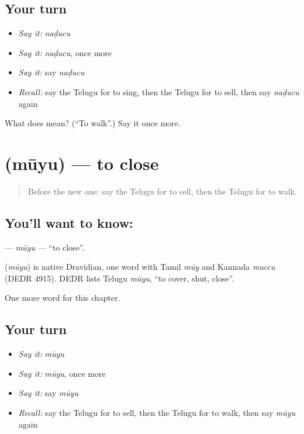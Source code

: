 \subsection*{Your turn}
\begin{itemize}
\raggedright
  \item \emph{Say it:} \emph{naḍucu}
  \item \emph{Say it:} \emph{naḍucu}, once more
  \item \emph{Say it:} say \emph{naḍucu}
  \item \emph{Recall:} say the Telugu for to sing, then the Telugu for to sell, then say \emph{naḍucu} again
\end{itemize}

\begin{tcolorbox}[breakable,colback=teal!4,colframe=teal!35!black,title={Before you move on}]
What does  mean? (\textquotedblleft{}To walk\textquotedblright{}.) Say it once more.
\end{tcolorbox}
\section[\texorpdfstring{\te{మూయు} (mūyu)}{మూయు (mūyu)}]{ (mūyu) — to close}

\label{lesson:TE-C149-muyu}



\begin{quote}
Before the new one: say the Telugu for to sell, then the Telugu for to walk.
\end{quote}

\subsection*{You'll want to know: }
\textbf{} — \emph{mūyu} — \textquotedblleft{}to close\textquotedblright{}.

\begin{cousinweb}
\textbf{} (\emph{mūyu}) is native Dravidian, one word with Tamil \emph{mūy} and Kannada \emph{muccu} (DEDR 4915). DEDR lists Telugu \emph{mūyu}, \textquotedblleft{}to cover, shut, close\textquotedblright{}.
\end{cousinweb}

\begin{grammarlens}[title={What you've built}]
One more word for this chapter.
\end{grammarlens}

\subsection*{Your turn}
\begin{itemize}
\raggedright
  \item \emph{Say it:} \emph{mūyu}
  \item \emph{Say it:} \emph{mūyu}, once more
  \item \emph{Say it:} say \emph{mūyu}
  \item \emph{Recall:} say the Telugu for to sell, then the Telugu for to walk, then say \emph{mūyu} again
\end{itemize}

